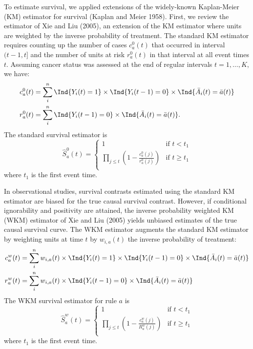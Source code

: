 \documentclass[
  11pt,
]{article}
\begin{document}
To estimate survival, we applied extensions of the widely-known
Kaplan-Meier (KM) estimator for survival (Kaplan and Meier 1958). First,
we review the estimator of Xie and Liu (2005), an extension of the KM
estimator where units are weighted by the inverse probability of
treatment. The standard KM estimator requires counting up the number of
cases \(c^0_{a}(t)\) that occurred in interval \((t - 1, t]\) and the
number of units at risk \(r^0_{a}(t)\) in that interval at all event
times \(t\). Assuming cancer status was assessed at the end of regular
intervals \(t = 1, \ldots, K\), we have: \[\begin{aligned}
c^0_{a} (t)
& = \sum_i^n \Ind{Y_i(t) = 1} \times \Ind{Y_i(t - 1) = 0} \times \Ind{\bar A_i (t) = \bar a(t)} \\
r^0_{a} (t)
& = \sum_i^n \Ind{Y_i(t - 1) = 0} \times \Ind{\bar A_i (t) = \bar a(t)}.
\end{aligned}\] The standard survival estimator is \[\hat S^0_{a}(t) =
\begin{cases}
1 & \text{if } t < t_1 \\
\prod_{j \le t} \left(1 - \frac{c^0_{a}(j)}{r^0_{a}(j)}\right) & \text{if } t \ge t_1 \\
\end{cases}\] where \(t_1\) is the first event time.

In observational studies, survival contrasts estimated using the
standard KM estimator are biased for the true causal survival contrast.
However, if conditional ignorability and positivity are attained, the
inverse probability weighted KM (WKM) estimator of Xie and Liu (2005)
yields unbiased estimates of the true causal survival curve. The WKM
estimator augments the standard KM estimator by weighting units at time
\(t\) by \(w_{i, a}(t)\) the inverse probability of treatment:
\[\begin{aligned}
c^w_{a} (t)
& = \sum_i^n w_{i, a}(t) \times \Ind{Y_i(t) = 1} \times \Ind{Y_i(t - 1) = 0} \times \Ind{\bar A_i (t) = \bar a(t)}\\
r^w_{a} (t)
& = \sum_i^n w_{i, a}(t) \times \Ind{Y_i(t - 1) = 0} \times \Ind{\bar A_i (t) = \bar a(t)}
\end{aligned}\] The WKM survival estimator for rule \(a\) is
\[\hat S^w_{a}(t) =
\begin{cases}
1 & \text{if } t < t_1 \\
\prod_{j \le t} \left(1 - \frac{c^w_{a}(j)}{R^w_{a}(j)}\right) & \text{if } t \ge t_1 \\
\end{cases}\] where \(t_1\) is the first event time.
\end{document}
